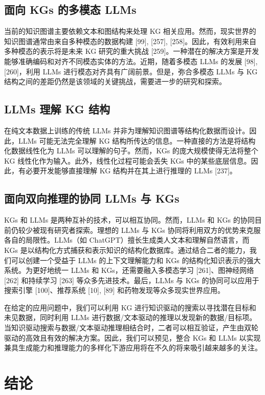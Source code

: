 \documentclass[11pt,UTF8,fontset=fandol]{ctexart}
\begin{document}
\subsection{面向 KGs 的多模态 LLMs}

当前的知识图谱主要依赖文本和图结构来处理 KG 相关应用。然而，现实世界的知识图谱通常由来自多种模态的数据构建 [99], [257], [258]。因此，有效利用来自多种模态的表示将是未来 KG 研究的重大挑战 [259]。一种潜在的解决方案是开发能够准确编码和对齐不同模态实体的方法。近期，随着多模态 LLMs 的发展 [98], [260]，利用 LLMs 进行模态对齐具有广阔前景。但是，弥合多模态 LLMs 与 KG 结构之间的差距仍然是该领域的关键挑战，需要进一步的研究和探索。

\subsection{LLMs 理解 KG 结构}

在纯文本数据上训练的传统 LLMs 并非为理解知识图谱等结构化数据而设计。因此，LLMs 可能无法完全理解 KG 结构所传达的信息。一种直接的方法是将结构化数据线性化为 LLMs 可以理解的句子。然而，KGs 的庞大规模使得无法将整个 KG 线性化作为输入。此外，线性化过程可能会丢失 KGs 中的某些底层信息。因此，有必要开发能够直接理解 KG 结构并在其上进行推理的 LLMs [237]。

\subsection{面向双向推理的协同 LLMs 与 KGs}

KGs 和 LLMs 是两种互补的技术，可以相互协同。然而，LLMs 和 KGs 的协同目前仍较少被现有研究者探索。理想的 LLMs 与 KGs 协同将利用双方的优势来克服各自的局限性。LLMs（如 ChatGPT）擅长生成类人文本和理解自然语言，而 KGs 是以结构化方式捕获和表示知识的结构化数据库。通过结合二者的能力，我们可以创建一个受益于 LLMs 的上下文理解能力和 KGs 的结构化知识表示的强大系统。为更好地统一 LLMs 和 KGs，还需要融入多模态学习 [261]、图神经网络 [262] 和持续学习 [263] 等众多先进技术。最后，LLMs 与 KGs 的协同可以应用于搜索引擎 [100]、推荐系统 [10], [89] 和药物发现等众多现实世界应用。

在给定的应用问题中，我们可以利用 KG 进行知识驱动的搜索以寻找潜在目标和未见数据，同时利用 LLMs 进行数据/文本驱动的推理以发现新的数据/目标项。当知识驱动搜索与数据/文本驱动推理相结合时，二者可以相互验证，产生由双轮驱动的高效且有效的解决方案。因此，我们可以预见，整合 KGs 和 LLMs 以实现兼具生成能力和推理能力的多样化下游应用将在不久的将来吸引越来越多的关注。

\section{结论}
\end{document}
